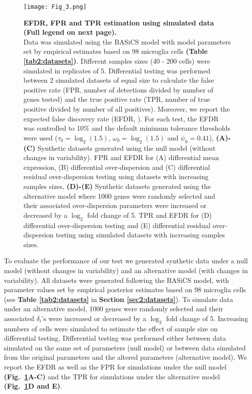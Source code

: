 \begin{figure}[!h]
\centering
\texttt{[image: Fig\_3.png]}
\caption[EFDR, FPR and TPR estimation using simulated data]{\textbf{EFDR, FPR and TPR estimation using simulated data (Full legend on next page).}\\
Data was simulated using the BASiCS model with model parameters set by empirical estimates based on 98 microglia cells \citep{Zeisel2015} \textbf{(Table \ref{tab2:datasets})}. Different samples sizes (40 - 200 cells) were simulated in replicates of 5. Differential testing was performed between 2 simulated datasets of equal size to calculate the false positive rate (FPR, number of detections divided by number of genes tested) and the true positive rate (TPR, number of true positive divided by number of all positives). Moreover, we report the expected false discovery rate (EFDR, \citep{Newton2004}). For each test, the EFDR was controlled to 10\% and the default minimum tolerance thresholds were used ($\tau_0 = \log_2(1.5)$, $\omega_0 = \log_2(1.5)$ and $\psi_0 = 0.41$), \textbf{(A)-(C)} Synthetic datasets generated using the null model (without changes in variability). FPR and EFDR for (A) differential mean expression, (B) differential over-dispersion and (C) differential residual over-dispersion testing using datasets with increasing samples sizes, \textbf{(D)-(E)} Synthetic datasets generated using the alternative model where 1000 genes were randomly selected and their associated over-dispersion parameters were increased or decreased by a $\log_2$ fold change of 5. TPR and EFDR for (D) differential over-dispersion testing and (E) differential residual over-dispersion testing using simulated datasets with increasing samples sizes.}\label{fig2:EFDR}
\end{figure}

\newpage

To evaluate the performance of our test we generated synthetic data under a null model (without changes in variability) and an alternative model (with changes in variability). All datasets were generated following the BASiCS model, with parameter values set by empirical posterior estimates based on 98 microglia cells \citep{Zeisel2015} (see \textbf{Table \ref{tab2:datasets}} in \textbf{Section \ref{sec2:datasets}}). To simulate data under an alternative model, 1000 genes were randomly selected and their associated $\delta_i$'s were increased or decreased by a $\log_2$ fold change of 5. Increasing numbers of cells were simulated to estimate the effect of sample size on differential testing. Differential testing was performed either between data simulated on the same set of parameters (null model) or between data simulated from the original parameters and the altered parameters (alternative model). We report the EFDR \citep{Newton2004} as well as the \gls{FPR} for simulations under the null model \textbf{(Fig.~\ref{fig2:EFDR}A-C)} and the \gls{TPR} for simulations under the alternative model \textbf{(Fig.~\ref{fig2:EFDR}D and E)}. \\

